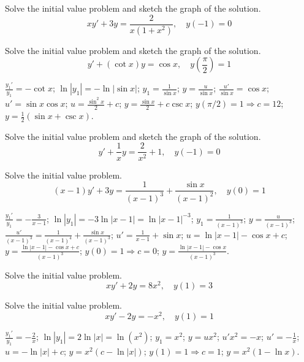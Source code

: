 \documentclass{ximera}
\begin{document}
\begin{problem}\label{exer:2.1.27} Solve the
initial value problem and sketch the graph of the solution.
$$xy'+3y=\frac{2}{x(1+x^2)},\quad y(-1)=0$$
\end{problem}

\begin{problem}\label{exer:2.1.28} Solve the
initial value problem and sketch the graph of the solution.
$$y'+ (\cot x)y=\cos x,\quad
y\left(\frac{\pi}{2}\right)=1$$



\begin{solution}
    $\frac{y_1'}{ y_1}=-\cot x$;\quad
$\ln|y_1|=-\ln|\sin x|$;\quad
$y_1=\frac{1}{\sin x}$;\quad
$y=\frac{u}{\sin x}$;\quad
$\frac{u'}{\sin x}=\cos x$;\quad
$u'=\sin x\cos x$;\quad
$u=\frac{\sin^2x}{2}+c$;\quad
$y=\frac{\sin x}{2}+c\csc x$;\quad
$y(\pi/2)=1\Rightarrow c={1}{2}$;\quad
$y=\frac{1}{2}(\sin x+\csc x)$.
\end{solution}
\end{problem}

\begin{problem}\label{exer:2.1.29} Solve the
initial value problem and sketch the graph of the solution.
$$y'+\frac{1}{x}y=\frac{2}{x^2}+1,\quad y(-1)=0$$
\end{problem}

\begin{problem}\label{exer:2.1.30} Solve the initial value problem.
$$(x-1)y'+3y=\frac{1}{(x-1)^3} +
\frac{\sin x}{(x-1)^2},\quad y(0)=1$$



\begin{solution}
    $\frac{y_1'}{ y_1}=-\frac{3}{ x-1}$;\quad
$\ln|y_1|=-3\ln|x-1|
=\ln|x-1|^{-3}$;\quad
$y_1=\frac{1}{(x-1)^3}$;\quad
$y=\frac{u}{(x-1)^3}$;\quad
$\frac{u'}{(x-1)^3}=
\frac{1}{(x-1)^4}+\frac{\sin
x}{(x-1)^3}$;\quad
$u'=\frac{1}{ x-1}+\sin x$;\quad
$u=\ln|x-1|-\cos x+c$;\quad
$y=\frac{\ln|x-1|-\cos x+c}{(x-1)^3}$;\quad
$y(0)=1\Rightarrow c=0$;\quad
$y=\frac{\ln|x-1|-\cos x}{(x-1)^3}$.
\end{solution}
\end{problem}

\begin{problem}\label{exer:2.1.31} Solve the initial value problem.
$$xy'+2y=8x^2,\quad y(1)=3$$
\end{problem}

\begin{problem}\label{exer:2.1.32} Solve the initial value problem.
$$xy'-2y=-x^2,\quad y(1)=1$$



\begin{solution}
    $\frac{y_1'}{ y_1}=-\frac{2}{ x}$;\quad
$\ln|y_1|=2\ln|x|=\ln(x^2)$;\quad
$y_1=x^2$;\quad
$y=ux^2$;\quad
$u'x^2=-x$;\quad
$u'=-\frac{1}{ x}$;\quad
$u=-\ln|x|+c$;\quad
$y=x^2(c-\ln|x|)$;\quad
$y(1)=1\Rightarrow c=1$;\quad
$y=x^2(1-\ln x)$.
\end{solution}
\end{problem}
\end{document}

